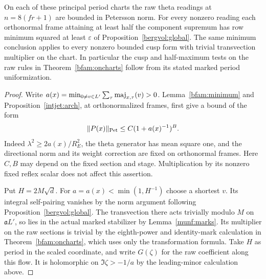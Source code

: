 \begin{proposition}\label{crev:half}
On each of these principal period charts the raw theta readings at
\(n=8(fr+1)\) are bounded in Petersson norm. For every nonzero
reading each orthonormal frame attaining at least half the component
supremum has row minimum squared at least \(\varepsilon\) of
Proposition~\ref{bergvol:global}. The same minimum conclusion applies
to every nonzero bounded cusp form with trivial transvection multiplier on
the chart. In particular the cusp and half-maximum tests on the raw
rules in Theorem~\ref{bfam:oncharts} follow from its stated marked
period uniformization.
\end{proposition}
\begin{proof}
Write \(a(x)=\min_{0\ne v\in L'}\sum_\tau{\rm maj}_{x,\tau}(v)>0\).
Lemma~\ref{bfam:minimum} and Proposition~\ref{intjet:arch}, at
orthonormalized frames, first give a bound of the form
\[
             \|P(x)\|_{\rm Pet}\le C(1+a(x)^{-1})^B .
\]
Indeed \(\lambda^2\ge 2a(x)/R_E^2\), the theta generator has
mean square one, and the directional norm and its weight correction
are fixed on orthonormal frames. Here \(C,B\) may depend on the
fixed section and stage. Multiplication by its nonzero fixed
reflex scalar does not affect this assertion.

Put \(H=2M\sqrt d\). For \(a=a(x)<\min(1,H^{-1})\) choose a
shortest \(v\). Its integral self-pairing vanishes by the norm
argument following Proposition~\ref{bergvol:global}. The
transvection there acts trivially modulo \(M\) on \(\mathfrak a L'\),
so lies in the actual marked stabilizer by Lemma~\ref{munf:marks}.
Its multiplier on the raw sections is trivial by the eighth-power
and identity-mark calculation in Theorem~\ref{bfam:oncharts},
which uses only the transformation formula. Take \(H\) as period
in the scaled coordinate, and write \(G(\zeta)\) for the raw
coefficient along this flow. It is holomorphic on
\(\Im\zeta>-1/a\) by the leading-minor calculation above.


\end{proof}
